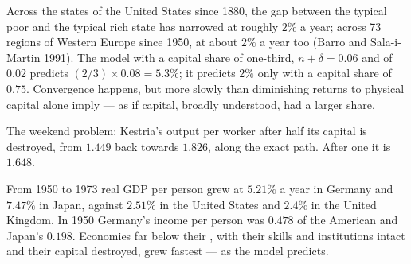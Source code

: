 \begin{record}
Across the states of the United States since 1880, the gap between the
typical poor and the typical rich state has narrowed at roughly $2\%$ a
year; across 73 regions of Western Europe since 1950, at about $2\%$ a year
too (Barro and Sala-i-Martin 1991). %
The model with a capital share of one-third, $n + \delta = 0.06$ and  of $0.02$ predicts $(2/3) \times 0.08 = 5.3\%$; it predicts $2\%$ only with a
capital share of $0.75$. %
Convergence happens, but more slowly than diminishing returns to physical
capital alone imply --- as if capital, broadly understood, had a larger
share.
\end{record}

\begin{omfigure}

{\small The weekend problem: Kestria's output per worker after half its
capital is destroyed, from $1.449$ back towards $1.826$, along the exact path.
After one  it is $1.648$.}
\end{omfigure}

\begin{record}
From 1950 to 1973 real GDP per person grew at $5.21\%$ a year in Germany and
$7.47\%$ in Japan, against $2.51\%$ in the United States and $2.4\%$ in the United
Kingdom. %
In 1950 Germany's income per person was $0.478$ of the American and Japan's
$0.198$. %
Economies far below their , with their skills and
institutions intact and their capital destroyed, grew fastest --- as the
model predicts.
\end{record}

